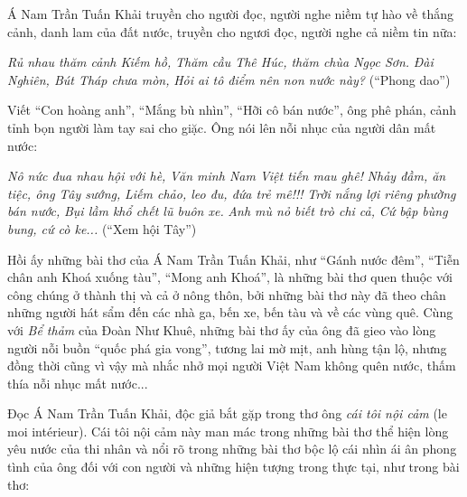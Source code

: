 \documentclass[../main.tex]{subfiles}
\begin{document}
\begin{multicols}{2}
\begin{blockquote}
\end{blockquote}
 
Á Nam Trần Tuấn Khải truyền cho người đọc, người nghe niềm tự hào về thắng cảnh, danh lam của đất nước, truyền cho ngươi đọc, người nghe cả niềm tin nữa: 
\begin{blockquote}
        
\textit{Rủ nhau thăm cảnh Kiếm hồ,}        
\textit{Thăm cầu Thê Húc, thăm chùa Ngọc Sơn.}        
\textit{Đài Nghiên, Bút Tháp chưa mòn,}        
\textit{Hỏi ai tô điểm nên non nước này?}        
(“Phong dao”) 

\end{blockquote}
 
Viết “Con hoàng anh”, “Mắng bù nhìn”, “Hỡi cô bán nước”, ông phê phán, cảnh tỉnh bọn người làm tay sai cho giặc. Ông nói lên nỗi nhục của người dân mất nước: 
\begin{blockquote}
        
\textit{Nô nức đua nhau hội với hè,}        
\textit{Văn minh Nam Việt tiến mau ghê!}        
\textit{Nhảy đầm, ăn tiệc, ông Tây sướng,}        
\textit{Liếm chảo, leo đu, đứa trẻ mê!!!}        
\textit{Trời nắng lợi riêng phường bán nước,}        
\textit{Bụi lầm khổ chết lũ buôn xe.}        
\textit{Anh mù nỏ biết trò chi cả,}        
\textit{Cứ bập bùng bung, cứ cò ke...}        
(“Xem hội Tây”) 

\end{blockquote}
 
Hồi ấy những bài thơ của Á Nam Trần Tuấn Khải, như “Gánh nước đêm”, “Tiễn chân anh Khoá xuống tàu”, “Mong anh Khoá”, là những bài thơ quen thuộc với công chúng ở thành thị và cả ở nông thôn, bởi những bài thơ này đã theo chân những người hát sẩm đến các nhà ga, bến xe, bến tàu và về các vùng quê. Cùng với \textit{Bể thảm} của Đoàn Như Khuê, những bài thơ ấy của ông đã gieo vào lòng người nỗi buồn “quốc phá gia vong”, tương lai mờ mịt, anh hùng tận lộ, nhưng đồng thời cũng vì vậy mà nhắc nhở mọi người Việt Nam không quên nước, thấm thía nỗi nhục mất nước... 
 
Đọc Á Nam Trần Tuấn Khải, độc giả bắt gặp trong thơ ông \textit{cái tôi nội cảm} (le moi intérieur). Cái tôi nội cảm này man mác trong những bài thơ thể hiện lòng yêu nước của thi nhân và nổi rõ trong những bài thơ bộc lộ cái nhìn ái ân phong tình của ông đối với con người và những hiện tượng trong thực tại, như trong bài thơ: 
\begin{blockquote}
        

\end{blockquote}
\end{multicols}
\end{document}
